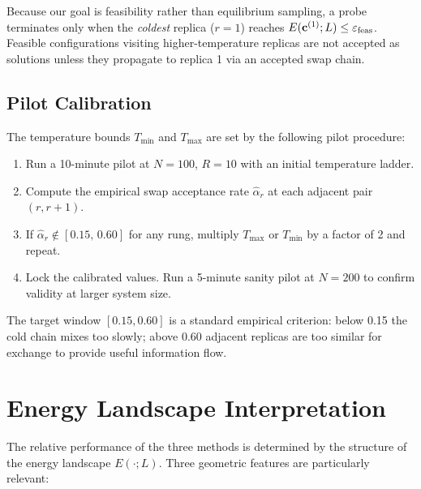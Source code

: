 Because our goal is feasibility rather than equilibrium sampling,
a probe terminates only when the \emph{coldest} replica ($r = 1$)
reaches $E(\mathbf{c}^{(1)};L) \le \varepsilon_{\mathrm{feas}}$.
Feasible configurations visiting higher-temperature replicas are
not accepted as solutions unless they propagate to replica 1 via
an accepted swap chain.

\subsection{Pilot Calibration}
\label{sec:pt-pilot}

The temperature bounds $T_{\min}$ and $T_{\max}$ are set by the
following pilot procedure:
\begin{enumerate}
  \item Run a 10-minute pilot at $N=100$, $R=10$ with an initial
        temperature ladder.
  \item Compute the empirical swap acceptance rate $\hat{\alpha}_r$ at
        each adjacent pair $(r, r+1)$.
  \item If $\hat{\alpha}_r \notin [0.15,\, 0.60]$ for any rung,
        multiply $T_{\max}$ or $T_{\min}$ by a factor of 2 and repeat.
  \item Lock the calibrated values. Run a 5-minute sanity pilot at
        $N=200$ to confirm validity at larger system size.
\end{enumerate}
The target window $[0.15, 0.60]$ is a standard empirical criterion:
below 0.15 the cold chain mixes too slowly; above 0.60 adjacent
replicas are too similar for exchange to provide useful information flow.

\section{Energy Landscape Interpretation}

The relative performance of the three methods is determined by the
structure of the energy landscape $E(\cdot; L)$.
Three geometric features are particularly relevant:


